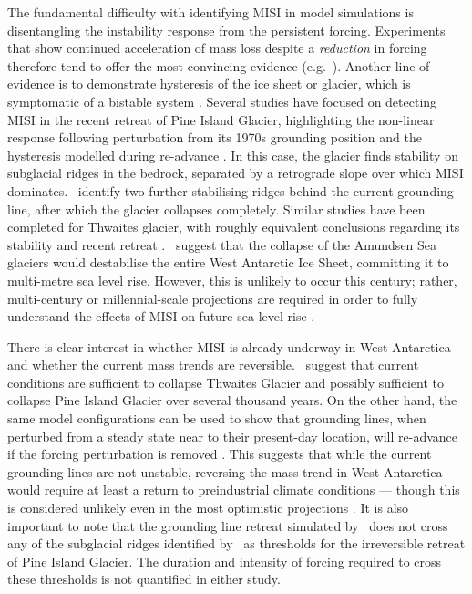 The fundamental difficulty with identifying MISI in model simulations is disentangling the instability response from the persistent forcing. Experiments that show continued acceleration of mass loss despite a \textit{reduction} in forcing therefore tend to offer the most convincing evidence (e.g.~\citealt{feldmannCollapseWestAntarctic2015,gandyMarineIceSheet2018}). Another line of evidence is to demonstrate hysteresis of the ice sheet or glacier, which is symptomatic of a bistable system \citep{garbeHysteresisAntarcticIce2020,rosierTippingPointsEarly2021,reedRecentIrreversibleRetreat2024}. Several studies have focused on detecting MISI in the recent retreat of Pine Island Glacier, highlighting the non-linear response following perturbation from its 1970s grounding position \citep{favierRetreatPineIsland2014,reedRecentIrreversibleRetreat2024} and the hysteresis modelled during re-advance \citep{rosierTippingPointsEarly2021,reedRecentIrreversibleRetreat2024}. In this case, the glacier finds stability on subglacial ridges in the bedrock, separated by a retrograde slope over which MISI dominates.~\cite{rosierTippingPointsEarly2021} identify two further stabilising ridges behind the current grounding line, after which the glacier collapses completely. Similar studies have been completed for Thwaites glacier, with roughly equivalent conclusions regarding its stability and recent retreat \citep{joughinMarineIceSheet2014,waibelRateMassLoss2018}.~\cite{feldmannCollapseWestAntarctic2015} suggest that the collapse of the Amundsen Sea glaciers would destabilise the entire West Antarctic Ice Sheet, committing it to multi-metre sea level rise. However, this is unlikely to occur this century; rather, multi-century or millennial-scale projections are required in order to fully understand the effects of MISI on future sea level rise \citep{seroussiEvolutionAntarcticIce2024,kloseLongtermSealevelCommitment2024}.

There is clear interest in whether MISI is already underway in West Antarctica and whether the current mass trends are reversible.~\cite{reeseStabilityPresentdayAntarctic2023} suggest that current conditions are sufficient to collapse Thwaites Glacier and possibly sufficient to collapse Pine Island Glacier over several thousand years. On the other hand, the same model configurations can be used to show that grounding lines, when perturbed from a steady state near to their present-day location, will re-advance if the forcing perturbation is removed \citep{hillStabilityPresentdayAntarctic2023}. This suggests that while the current grounding lines are not unstable, reversing the mass trend in West Antarctica would require at least a return to preindustrial climate conditions --- though this is considered unlikely even in the most optimistic projections \citep{naughtenUnavoidableFutureIncrease2023}. It is also important to note that the grounding line retreat simulated by~\cite{hillStabilityPresentdayAntarctic2023} does not cross any of the subglacial ridges identified by~\cite{rosierTippingPointsEarly2021} as thresholds for the irreversible retreat of Pine Island Glacier. The duration and intensity of forcing required to cross these thresholds is not quantified in either study.

